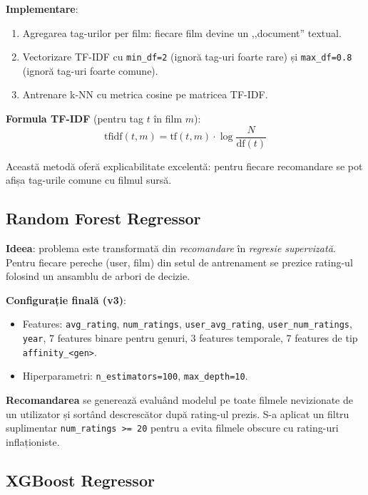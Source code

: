 \documentclass[12pt,a4paper]{article}
\begin{document}
\textbf{Implementare}:
\begin{enumerate}[noitemsep]
    \item Agregarea tag-urilor per film: fiecare film devine un ,,document'' textual.
    \item Vectorizare TF-IDF cu \texttt{min\_df=2} (ignoră tag-uri foarte rare) și \texttt{max\_df=0.8} (ignoră tag-uri foarte comune).
    \item Antrenare k-NN cu metrica cosine pe matricea TF-IDF.
\end{enumerate}

\textbf{Formula TF-IDF} (pentru tag $t$ în film $m$):
$$\text{tfidf}(t, m) = \text{tf}(t, m) \cdot \log\frac{N}{\text{df}(t)}$$

Această metodă oferă explicabilitate excelentă: pentru fiecare recomandare se pot afișa tag-urile comune cu filmul sursă.

\subsection{Random Forest Regressor}

\textbf{Ideea}: problema este transformată din \textit{recomandare} în \textit{regresie supervizată}. Pentru fiecare pereche (user, film) din setul de antrenament se prezice rating-ul folosind un ansamblu de arbori de decizie.

\textbf{Configurație finală (v3)}:
\begin{itemize}[noitemsep]
    \item Features: \texttt{avg\_rating}, \texttt{num\_ratings}, \texttt{user\_avg\_rating}, \texttt{user\_num\_ratings}, \texttt{year}, 7 features binare pentru genuri, 3 features temporale, 7 features de tip \texttt{affinity\_<gen>}.
    \item Hiperparametri: \texttt{n\_estimators=100}, \texttt{max\_depth=10}.
\end{itemize}

\textbf{Recomandarea} se generează evaluând modelul pe toate filmele nevizionate de un utilizator și sortând descrescător după rating-ul prezis. S-a aplicat un filtru suplimentar \texttt{num\_ratings >= 20} pentru a evita filmele obscure cu rating-uri inflaționiste.

\subsection{XGBoost Regressor}
\end{document}
